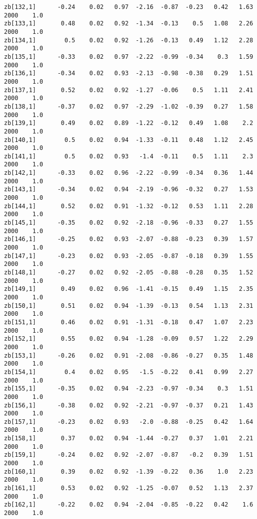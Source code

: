 \documentclass[11pt]{article}
\begin{document}
\begin{Verbatim}[commandchars=\\\{\}]
zb[132,1]      -0.24    0.02   0.97  -2.16  -0.87  -0.23   0.42   1.63   2000    1.0
zb[133,1]       0.48    0.02   0.92  -1.34  -0.13    0.5   1.08   2.26   2000    1.0
zb[134,1]        0.5    0.02   0.92  -1.26  -0.13   0.49   1.12   2.28   2000    1.0
zb[135,1]      -0.33    0.02   0.97  -2.22  -0.99  -0.34    0.3   1.59   2000    1.0
zb[136,1]      -0.34    0.02   0.93  -2.13  -0.98  -0.38   0.29   1.51   2000    1.0
zb[137,1]       0.52    0.02   0.92  -1.27  -0.06    0.5   1.11   2.41   2000    1.0
zb[138,1]      -0.37    0.02   0.97  -2.29  -1.02  -0.39   0.27   1.58   2000    1.0
zb[139,1]       0.49    0.02   0.89  -1.22  -0.12   0.49   1.08    2.2   2000    1.0
zb[140,1]        0.5    0.02   0.94  -1.33  -0.11   0.48   1.12   2.45   2000    1.0
zb[141,1]        0.5    0.02   0.93   -1.4  -0.11    0.5   1.11    2.3   2000    1.0
zb[142,1]      -0.33    0.02   0.96  -2.22  -0.99  -0.34   0.36   1.44   2000    1.0
zb[143,1]      -0.34    0.02   0.94  -2.19  -0.96  -0.32   0.27   1.53   2000    1.0
zb[144,1]       0.52    0.02   0.91  -1.32  -0.12   0.53   1.11   2.28   2000    1.0
zb[145,1]      -0.35    0.02   0.92  -2.18  -0.96  -0.33   0.27   1.55   2000    1.0
zb[146,1]      -0.25    0.02   0.93  -2.07  -0.88  -0.23   0.39   1.57   2000    1.0
zb[147,1]      -0.23    0.02   0.93  -2.05  -0.87  -0.18   0.39   1.55   2000    1.0
zb[148,1]      -0.27    0.02   0.92  -2.05  -0.88  -0.28   0.35   1.52   2000    1.0
zb[149,1]       0.49    0.02   0.96  -1.41  -0.15   0.49   1.15   2.35   2000    1.0
zb[150,1]       0.51    0.02   0.94  -1.39  -0.13   0.54   1.13   2.31   2000    1.0
zb[151,1]       0.46    0.02   0.91  -1.31  -0.18   0.47   1.07   2.23   2000    1.0
zb[152,1]       0.55    0.02   0.94  -1.28  -0.09   0.57   1.22   2.29   2000    1.0
zb[153,1]      -0.26    0.02   0.91  -2.08  -0.86  -0.27   0.35   1.48   2000    1.0
zb[154,1]        0.4    0.02   0.95   -1.5  -0.22   0.41   0.99   2.27   2000    1.0
zb[155,1]      -0.35    0.02   0.94  -2.23  -0.97  -0.34    0.3   1.51   2000    1.0
zb[156,1]      -0.38    0.02   0.92  -2.21  -0.97  -0.37   0.21   1.43   2000    1.0
zb[157,1]      -0.23    0.02   0.93   -2.0  -0.88  -0.25   0.42   1.64   2000    1.0
zb[158,1]       0.37    0.02   0.94  -1.44  -0.27   0.37   1.01   2.21   2000    1.0
zb[159,1]      -0.24    0.02   0.92  -2.07  -0.87   -0.2   0.39   1.51   2000    1.0
zb[160,1]       0.39    0.02   0.92  -1.39  -0.22   0.36    1.0   2.23   2000    1.0
zb[161,1]       0.53    0.02   0.92  -1.25  -0.07   0.52   1.13   2.37   2000    1.0
zb[162,1]      -0.22    0.02   0.94  -2.04  -0.85  -0.22   0.42    1.6   2000    1.0

\end{Verbatim}
\end{document}
